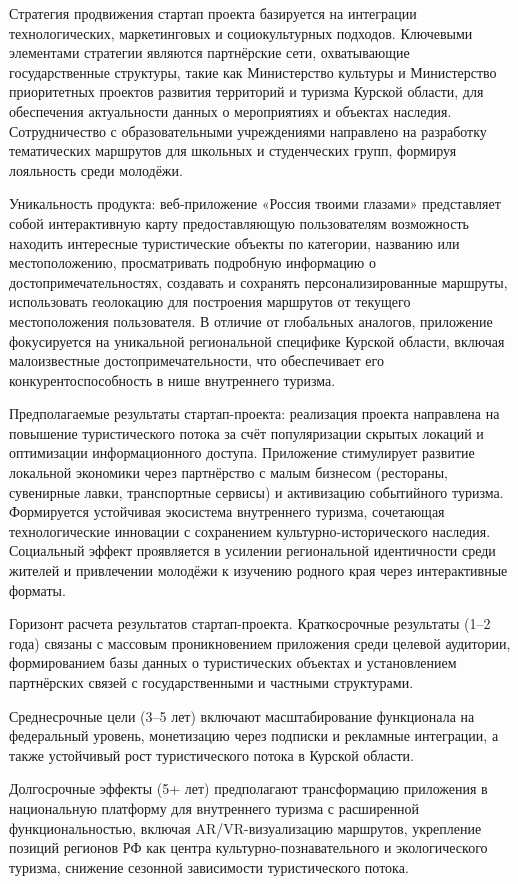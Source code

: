 Стратегия продвижения стартап проекта базируется на интеграции технологических, маркетинговых и социокультурных подходов. Ключевыми элементами стратегии являются партнёрские сети, охватывающие государственные структуры, такие как Министерство культуры и Министерство приоритетных проектов развития территорий и туризма Курской области, для обеспечения актуальности данных о мероприятиях и объектах наследия. Сотрудничество с образовательными учреждениями направлено на разработку тематических маршрутов для школьных и студенческих групп, формируя лояльность среди молодёжи.

Уникальность продукта: веб-приложение «Россия твоими глазами» представляет собой интерактивную карту предоставляющую пользователям возможность находить интересные туристические объекты по категории, названию или местоположению, просматривать подробную информацию о достопримечательностях, создавать и сохранять персонализированные маршруты, использовать геолокацию для построения маршрутов от текущего местоположения пользователя. В отличие от глобальных аналогов, приложение фокусируется на уникальной региональной специфике Курской области, включая малоизвестные достопримечательности, что обеспечивает его конкурентоспособность в нише внутреннего туризма.

Предполагаемые результаты стартап-проекта: реализация проекта направлена на повышение туристического потока за счёт популяризации скрытых локаций и оптимизации информационного доступа. Приложение стимулирует развитие локальной экономики через партнёрство с малым бизнесом (рестораны, сувенирные лавки, транспортные сервисы) и активизацию событийного туризма. Формируется устойчивая экосистема внутреннего туризма, сочетающая технологические инновации с сохранением культурно-исторического наследия. Социальный эффект проявляется в усилении региональной идентичности среди жителей и привлечении молодёжи к изучению родного края через интерактивные форматы. 

Горизонт расчета результатов стартап-проекта. Краткосрочные результаты (1–2 года) связаны с массовым проникновением приложения среди целевой аудитории, формированием базы данных о туристических объектах и установлением партнёрских связей с государственными и частными структурами. 

Среднесрочные цели (3–5 лет) включают масштабирование функционала на федеральный уровень, монетизацию через подписки и рекламные интеграции, а также устойчивый рост туристического потока в Курской области. 

Долгосрочные эффекты (5+ лет) предполагают трансформацию приложения в национальную платформу для внутреннего туризма с расширенной функциональностью, включая AR/VR-визуализацию маршрутов, укрепление позиций регионов РФ как центра культурно-познавательного и экологического туризма, снижение сезонной зависимости туристического потока. 

